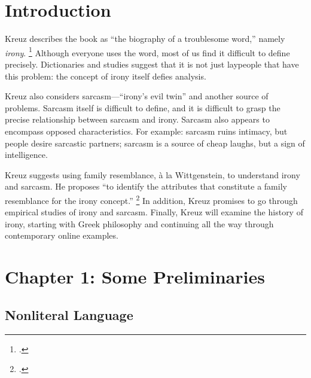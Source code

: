 \documentclass[12pt,letterpaper]{article}
\begin{document}

\pagestyle{notes}

\section*{Introduction}

Kreuz describes the book as ``the biography of a troublesome word,'' namely \textit{irony}.%
\footcite[xi]{kreuz-irony-and-sarcasm-2020}
Although everyone uses the word, most of us find it difficult to define precisely.
Dictionaries and studies suggest that it is not just laypeople that have this problem: the concept of irony itself defies analysis.

Kreuz also considers sarcasm---``irony's evil twin'' and another source of problems.
Sarcasm itself is difficult to define, and it is difficult to grasp the precise relationship between sarcasm and irony.
Sarcasm also appears to encompass opposed characteristics.
For example: sarcasm ruins intimacy, but people desire sarcastic partners; sarcasm is a source of cheap laughs, but a sign of intelligence.

Kreuz suggests using family resemblance, à la Wittgenstein, to understand irony and sarcasm.
He proposes ``to identify the attributes that constitute a family resemblance for the irony concept.''%
\footcite[xiv]{kreuz-irony-and-sarcasm-2020}
In addition, Kreuz promises to go through empirical studies of irony and sarcasm.
Finally, Kreuz will examine the history of irony, starting with Greek philosophy and continuing all the way through contemporary online examples.

\section*{Chapter 1: Some Preliminaries}

\subsection*{Nonliteral Language}
\end{document}
